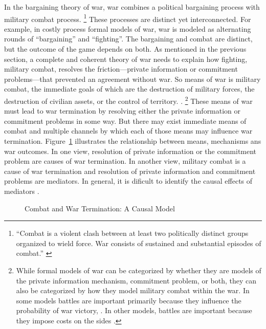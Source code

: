 In the bargaining theory of war, war combines a political bargaining process with military combat process. %
\footnote{%
  ``Combat is a violent clash between at least two politically
  distinct groups organized to wield force. War consists of sustained
  and substantial episodes of combat.'' \parencite{Reiter2003} %
} %
These processes are distinct yet interconnected.%
For example, in costly process formal models of war, war is modeled as alternating rounds of ``bargaining'' and ``fighting''. %
The bargaining and combat are distinct, but the outcome of the game depends on both.
As mentioned in the previous section, a complete and coherent theory of war needs to explain how fighting, \ie{}military combat, resolves the friction---private information or commitment problems---that prevented an agreement without war.
So means of war is military combat, the immediate goals of which are the destruction of military forces, the destruction of civilian assets, or the control of territory.
\parencite[30]{Reiter2003}.%
\footnote{
While formal models of war can be categorized by whether they are models of the private information mechanism, commitment problem, or both, they can also be categorized by how they model military combat within the war.
In some models battles are important primarily because they influence the probability of war victory, \parencites{Powell2004}{Wagner2000}{LeventogluSlantchev2007}{Slantchev2003}{SmithStam2004}.
In other models, battles are important because they impose costs on the sides \parencites{FilsonWerner2002}{Powell2004}{LeventogluSlantchev2007}. %
}
These means of war must lead to war termination by resolving either the private information or commitment problems in some way.
But there may exist immediate means of combat and multiple channels by which each of those means may influence war termination.
Figure~\ref{bonds:fig:combat-causal-diagram} illustrates the relationship between means, mechanisms ans war outcomes.
In one view, resolution of private information or the commitment problem are causes of war termination.
In another view, military combat is a cause of war termination and resolution of private information and commitment problems are mediators.
In general, it is dificult to identify the causal effects of mediators \parencite{Keele2015a}.

\begin{figure}[!htpb]
  \centering
  
  \caption{Combat and War Termination: A Causal Model}
  \label{bonds:fig:combat-causal-diagram}
\end{figure}

